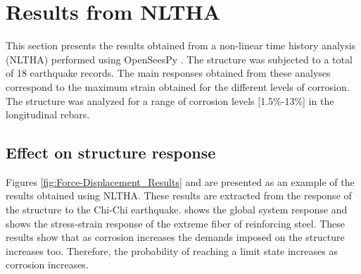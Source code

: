 %
%
\section{Results from NLTHA}
This section presents the results obtained from a non-linear time history analysis (NLTHA) performed using OpenSeesPy \cite{Zhu2018}. The structure was subjected to a total of 18 earthquake records. The main responses obtained from these analyses correspond to the maximum strain obtained for the different levels of corrosion. The structure was analyzed for a range of corrosion levels [1.5\%-13\%] in the longitudinal rebars.

\subsection{Effect on structure response}
Figures \ref{fig:Force-Displacement_Results} and  are presented as an example of the results obtained using NLTHA. These results are extracted from the response of the structure to the Chi-Chi earthquake.  shows the global system response and  shows the stress-strain response of the extreme fiber of reinforcing steel. These results show that as corrosion increases the demands imposed on the structure increases too. Therefore, the probability of reaching a limit state increases as corrosion increases.

